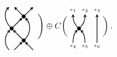 \documentclass{compositio}
\theoremstyle{definition}
\numberwithin{equation}{section}
\begin{document}
\begin{align}
\begin{tikzpicture}[scale=0.5,baseline=(02.base), inner sep=1mm, >=stealth]
\node (bl) at (0,-1) [circle] {};
\node (bm) at (0,-1) [circle] {};
\node (br) at (2,-1) [circle] {};
\node (tl) at (0,3) [circle] {};
\node (tm) at (0,3) [circle] {};
\node (tr) at (2,3) [circle] {};
\node (0) at (1,0) [circle,inner sep=1.5pt, thin,draw=black,fill= black] {};
\node (02) at (0,1) [circle,inner sep=1.5pt, thin,draw=black,fill= black] {};
\node (03) at (1,2) [circle,inner sep=1.5pt, thin,draw=black,fill= black] {};
\draw[->,  thick] (bl) to [out=135,in=-135] (02); 
\draw[->,  thick] (bm) -- (0); 
\draw[->,  thick] (br) -- (0); 
\draw[->,  thick] (0) to [out=135,in=-45] (02); 
\draw[->,  thick] (0) to [out=45,in=-45] (03); 
\draw[->,  thick] (02) to [out=135,in=-135] (tl); 
\draw[->,  thick] (02) -- (03); 
\draw[->,  thick] (03) -- (tr); 
\draw[->,  thick] (03) -- (tm); 
\end{tikzpicture} 
\! \Bigg)
\oplus C \bigg( 
\begin{tikzpicture}[scale=0.5,baseline=(02.base), inner sep=1mm, >=stealth]
\node (x1) at (1,3) [circle,inner sep=1.5pt, draw=white,fill= white] {{\tiny $x_{1}$}};
\node (x2) at (2,3) [circle,inner sep=1.5pt, draw=white,fill= white] {{\tiny $x_{2}$}};
\node (x3) at (3,3) [circle,inner sep=1.5pt, draw=white,fill= white] {{\tiny $x_{3}$}};
\node (x4) at (1,0) [circle,inner sep=1.5pt, draw=white,fill= white] {{\tiny $x_{4}$}};
\node (x5) at (2,0) [circle,inner sep=1.5pt, draw=white,fill= white] {{\tiny $x_{5}$}};
\node (x6) at (3,0) [circle,inner sep=1.5pt, draw=white,fill= white] {{\tiny $x_{6}$}};
\node (bl) at (3,0) [circle] {};
\node (bm) at (1,0) [circle] {};
\node (br) at (2,-0) [circle] {};
\node (tl) at (3,3) [circle] {};
\node (tm) at (1,3) [circle] {};
\node (tr) at (2,3) [circle] {};
\node (02) at (1.5,1.5) [circle,inner sep=1.5pt, thin,draw=black,fill= black] {};
\draw[ ->, thick ] (bl) -- (tl); 
\draw[->,  thick] (02) to [out=135,in=-90] (tm); 
\draw[->,  thick] (02) to [out=45,in=-90] (tr); 
\draw[->,  thick] (bm) to [out=90,in=-135] (02); 
\draw[->,  thick] (br) to [out=90,in=-45] (02); 
\end{tikzpicture}
\bigg) \, .
\end{align}
\end{document}
